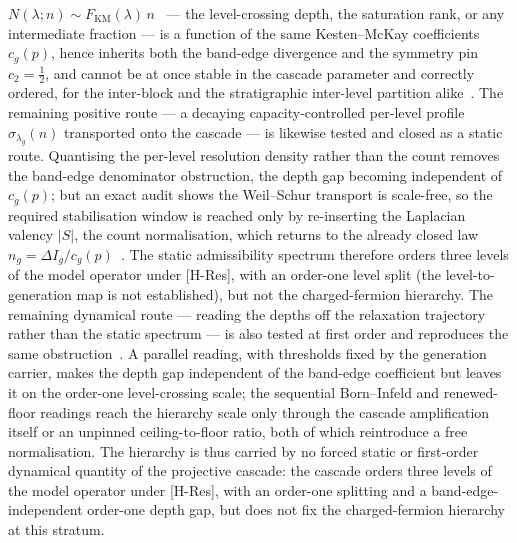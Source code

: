 \documentclass[11pt,a4paper]{article}
\begin{document}
    $N(\lambda;n)\sim F_{\mathrm{KM}}(\lambda)\,n$~\cite{Beau2026a5} --- the level-crossing depth, the saturation
    rank, or any intermediate fraction --- is a function of the same Kesten--McKay coefficients $c_g(p)$, hence
    inherits both the band-edge divergence and the symmetry pin $c_2=\tfrac12$, and cannot be at once stable in the
    cascade parameter and correctly ordered, for the inter-block and the stratigraphic inter-level partition
    alike~\cite{Beau2026pyo}.
    The remaining positive route --- a decaying capacity-controlled per-level profile $\sigma_{\lambda_g}(n)$
    transported onto the cascade --- is likewise tested and closed as a static route.
    Quantising the per-level resolution density rather than the count removes the band-edge denominator
    obstruction, the depth gap becoming independent of $c_g(p)$; but an exact audit shows the Weil--Schur
    transport is scale-free, so the required stabilisation window is reached only by re-inserting the Laplacian
    valency $|S|$, the count normalisation, which returns to the already closed law
    $n_g=\Delta I_g/c_g(p)$~\cite{Beau2026pyo}.
    The static admissibility spectrum therefore orders three levels of the model operator under [H-Res], with an
    order-one level split (the level-to-generation map is not established), but not the charged-fermion hierarchy.
    The remaining dynamical route --- reading the depths off the relaxation trajectory rather than the static
    spectrum --- is also tested at first order and reproduces the same obstruction~\cite{Beau2026pyo}.
    A parallel reading, with thresholds fixed by the generation carrier, makes the depth gap independent of the
    band-edge coefficient but leaves it on the order-one level-crossing scale; the sequential Born--Infeld and
    renewed-floor readings reach the hierarchy scale only through the cascade amplification itself or an unpinned
    ceiling-to-floor ratio, both of which reintroduce a free normalisation.
    The hierarchy is thus carried by no forced static or first-order dynamical quantity of the projective cascade:
    the cascade orders three levels of the model operator under [H-Res], with an order-one splitting and a
    band-edge-independent order-one depth gap, but does not fix the charged-fermion hierarchy at this stratum.
\end{document}
